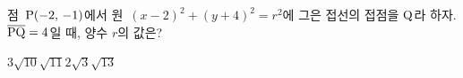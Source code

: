 점~$\mathrm{P}(-2,\,-1)$에서 원~$(x-2)^2+(y+4)^2=r^2$에 그은 접선의 접점을 $\mathrm{Q}$라 하자. $\overline{\mathrm{PQ}}=4$일 때, 양수 $r$의 값은?
\begin{choices32}{$3$}{$\sqrt{10}$}{$\sqrt{11}$}{$2\sqrt{3}$}{$\sqrt{13}$}\end{choices32}
